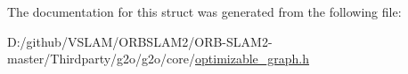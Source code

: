 The documentation for this struct was generated from the following file\+:\begin{DoxyCompactItemize}
\item 
D\+:/github/\+V\+S\+L\+A\+M/\+O\+R\+B\+S\+L\+A\+M2/\+O\+R\+B-\/\+S\+L\+A\+M2-\/master/\+Thirdparty/g2o/g2o/core/\mbox{\hyperlink{optimizable__graph_8h}{optimizable\+\_\+graph.\+h}}\end{DoxyCompactItemize}
